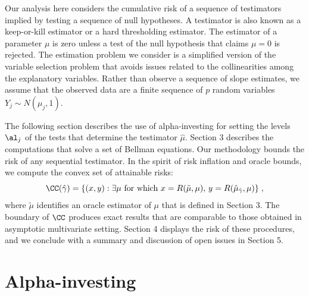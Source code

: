 \documentclass[12pt]{article}
\begin{document}
 Our analysis here considers the cumulative risk of a sequence of testimators
 implied by testing a sequence of null hypotheses.  A testimator is also known
 as a keep-or-kill estimator or a hard thresholding estimator.  The estimator of
 a parameter $\mu$ is zero unless a test of the null hypothesis that claims $\mu
 = 0$ is rejected.  The estimation problem we consider is a simplified version
 of the variable selection problem that avoids issues related to the
 collinearities among the explanatory variables.  
 Rather than observe a sequence
 of slope estimates, we assume that the observed data are a finite sequence of
 $p$ random variables $Y_j \sim N(\mu_j,1)$.  


 The following section describes the use of alpha-investing for setting the
 levels $\al_j$ of the tests that determine the testimator $\hat\mu$.  Section 3
 describes the computations that solve a set of Bellman equations.  Our
 methodology bounds the risk of any sequential testimator.  In the spirit of
 risk inflation and oracle bounds, we compute the convex set of attainable
 risks:
 \begin{equation}
   \CC(\hat\gamma) 
      = \{(x,y): \exists \mu \mbox{ for which }
                 x=R(\tilde\mu,\mu), \, y = R(\hat\mu_{\hat\gamma},\mu)\} \;,
 \label{eq:C}
 \end{equation}
 where $\tilde\mu$ identifies an oracle estimator of $\mu$ that is defined in
 Section 3.  The boundary of $\CC$ produces exact results that are comparable to
 those obtained in asymptotic multivariate setting.  Section 4 displays the risk
 of these procedures, and we conclude with a summary and discussion of open
 issues in Section 5.


\section{ Alpha-investing }
\end{document}
